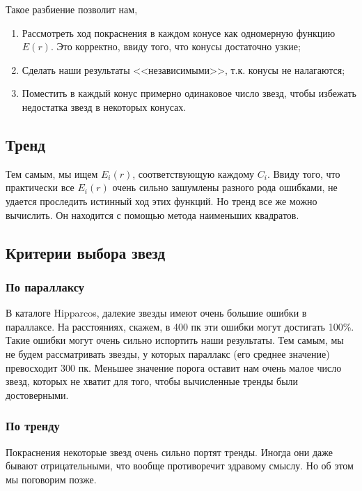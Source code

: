 \documentclass[14pt]{article}
\begin{document}
            Такое разбиение позволит нам,
            \begin{enumerate}
                \item Рассмотреть ход покраснения в каждом конусе как одномерную функцию $E(r)$. Это корректно, ввиду того, что конусы достаточно узкие;
                \item Сделать наши результаты <<независимыми>>, т.к. конусы не налагаются;
                \item Поместить в каждый конус примерно одинаковое число звезд, чтобы избежать недостатка звезд в некоторых конусах.  
            \end{enumerate}      
            
        \subsection{Тренд}
            Тем самым, мы ищем $E_i(r)$, соответствующую каждому $C_i$. Ввиду того, что практически все $E_i(r)$ очень сильно зашумлены разного рода ошибками, не удается проследить истинный ход этих функций. Но тренд все же можно вычислить. Он находится с помощью метода наименьших квадратов.  
            
        \subsection{Критерии выбора звезд}
            \subsubsection{По параллаксу}
                В каталоге Hipparcos, далекие звезды имеют очень большие ошибки в параллаксе. На расстояниях, скажем, в 400 пк эти ошибки могут достигать 100\%. Такие ошибки могут очень сильно испортить наши результаты. Тем самым, мы не будем рассматривать звезды, у которых параллакс (его среднее значение) превосходит 300 пк. Меньшее значение порога оставит нам очень малое число звезд, которых не хватит для того, чтобы вычисленные тренды были достоверными.
            \subsubsection{По тренду}
                Покраснения некоторые звезд очень сильно портят тренды. Иногда они даже бывают отрицательными, что вообще противоречит здравому смыслу. Но об этом мы поговорим позже.
                
\end{document}
